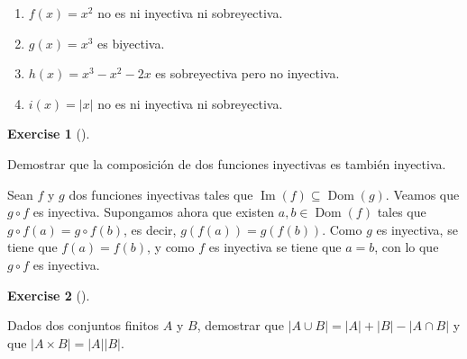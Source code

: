 \documentclass[
  letterpaper,
  DIV=11,
  numbers=noendperiod]{scrreport}
\providecommand{\tightlist}{%
  \setlength{\itemsep}{0pt}\setlength{\parskip}{0pt}}\usepackage{longtable,booktabs,array}
\theoremstyle{definition}
\newtheorem{exercise}{Exercise}[chapter]
\theoremstyle{remark}
\begin{document}
\begin{tcolorbox}[enhanced jigsaw, bottomtitle=1mm, opacityback=0, coltitle=black, toprule=.15mm, colback=white, titlerule=0mm, rightrule=.15mm, title=\textcolor{quarto-callout-tip-color}{\faLightbulb}\hspace{0.5em}{Solución}, breakable, bottomrule=.15mm, colbacktitle=quarto-callout-tip-color!10!white, toptitle=1mm, opacitybacktitle=0.6, left=2mm, leftrule=.75mm, colframe=quarto-callout-tip-color-frame, arc=.35mm]

\begin{enumerate}
\def\labelenumi{\alph{enumi}.}
\tightlist
\item
  \(f(x)=x^2\) no es ni inyectiva ni sobreyectiva.
\item
  \(g(x)=x^3\) es biyectiva.
\item
  \(h(x)=x^3-x^2-2x\) es sobreyectiva pero no inyectiva.
\item
  \(i(x)=|x|\) no es ni inyectiva ni sobreyectiva.
\end{enumerate}

\end{tcolorbox}

\leavevmode{}%
\begin{exercise}[]\label{exr-10}

Demostrar que la composición de dos funciones inyectivas es también
inyectiva.

\end{exercise}

\begin{tcolorbox}[enhanced jigsaw, bottomtitle=1mm, opacityback=0, coltitle=black, toprule=.15mm, colback=white, titlerule=0mm, rightrule=.15mm, title=\textcolor{quarto-callout-tip-color}{\faLightbulb}\hspace{0.5em}{Solución}, breakable, bottomrule=.15mm, colbacktitle=quarto-callout-tip-color!10!white, toptitle=1mm, opacitybacktitle=0.6, left=2mm, leftrule=.75mm, colframe=quarto-callout-tip-color-frame, arc=.35mm]
Sean \(f\) y \(g\) dos funciones inyectivas tales que
\(\operatorname{Im}(f)\subseteq\operatorname{Dom}(g)\). Veamos que
\(g\circ f\) es inyectiva. Supongamos ahora que existen
\(a, b\in \operatorname{Dom}(f)\) tales que \(g\circ f(a)=g\circ f(b)\),
es decir, \(g(f(a))=g(f(b))\). Como \(g\) es inyectiva, se tiene que
\(f(a)=f(b)\), y como \(f\) es inyectiva se tiene que \(a=b\), con lo
que \(g\circ f\) es inyectiva.
\end{tcolorbox}

\leavevmode{}%
\begin{exercise}[]\label{exr-11}

Dados dos conjuntos finitos \(A\) y \(B\), demostrar que
\(|A\cup B| = |A|+|B|-|A\cap B|\) y que \(|A\times B|=|A||B|\).

\end{exercise}
\end{document}

